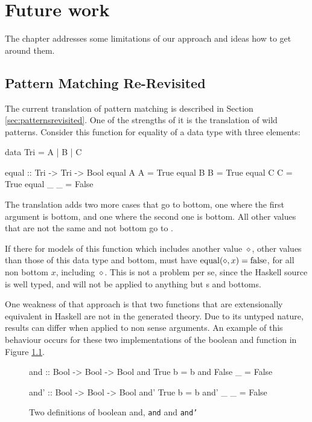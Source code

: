 \chapter{Future work}
\label{ch:future}

The chapter addresses some limitations of our approach and ideas how
to get around them.

\section{Pattern Matching Re-Revisited}
\label{sec:rerevisited}

The current translation of pattern matching is described in Section
\ref{sec:patternsrevisited}. One of the strengths of it is the
translation of wild patterns. Consider this function for equality of a
data type with three elements:

\begin{code}
data Tri = A | B | C

equal :: Tri -> Tri -> Bool
equal A A = True
equal B B = True
equal C C = True
equal _ _ = False
\end{code}

\noindent
The translation adds two more cases that go to bottom, one where the
first argument is bottom, and one where the second one is bottom. All
other values that are not the same  and not bottom go to
.

If there for models of this function which includes
another value $\diamond$, other values than those of this data type and
bottom, must have $\mathrm{equal}(\diamond,x) = \mathrm{false}$, for all non
bottom $x$, including $\diamond$. This is not a problem per se, since the
Haskell source is well typed, and  will not be applied to
anything but s and bottoms.

One weakness of that approach is that two functions that are
extensionally equivalent in Haskell are not in the generated
theory. Due to its untyped nature, results can differ when applied to
non sense arguments. An example of this behaviour occurs for these two
implementations of the boolean and function in Figure \ref{code:and}.

\begin{figure}[h!]
\centering
\begin{minipage}[b]{6cm}
\begin{code}
and :: Bool -> Bool -> Bool
and True  b = b
and False _ = False
\end{code}
\end{minipage}
\hspace{10pt}
\begin{minipage}[b]{6cm}
\begin{code}
and' :: Bool -> Bool -> Bool
and' True  b = b
and' _     _ = False
\end{code}
\end{minipage}
\caption{Two definitions of boolean and, \texttt{and} and \texttt{and'}
\label{code:and}
}
\end{figure}

